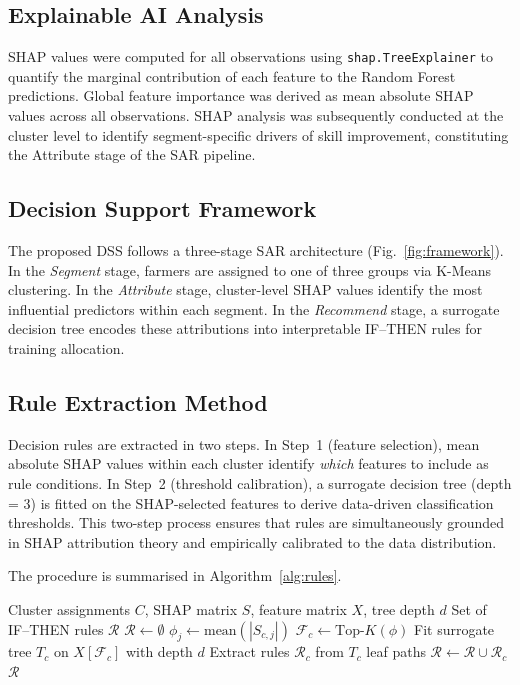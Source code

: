 \documentclass[3p,twocolumn,authoryear]{elsarticle}
\begin{document}
\subsection{Explainable AI Analysis}

SHAP values were computed for all observations using
\texttt{shap.TreeExplainer} \citep{lundberg2017} to quantify
the marginal contribution of each feature to the Random Forest
predictions.
Global feature importance was derived as mean absolute SHAP values
across all observations.
SHAP analysis was subsequently conducted at the cluster level to
identify segment-specific drivers of skill improvement,
constituting the Attribute stage of the SAR pipeline.

\subsection{Decision Support Framework}

The proposed DSS follows a three-stage SAR architecture
(Fig.~\ref{fig:framework}).
In the \textit{Segment} stage, farmers are assigned to one of
three groups via K-Means clustering.
In the \textit{Attribute} stage, cluster-level SHAP values
identify the most influential predictors within each segment.
In the \textit{Recommend} stage, a surrogate decision tree
encodes these attributions into interpretable IF--THEN rules
for training allocation.

\subsection{Rule Extraction Method}

Decision rules are extracted in two steps.
In Step~1 (feature selection), mean absolute SHAP values within
each cluster identify \textit{which} features to include as
rule conditions.
In Step~2 (threshold calibration), a surrogate decision tree
(depth = 3) is fitted on the SHAP-selected features to derive
data-driven classification thresholds.
This two-step process ensures that rules are simultaneously
grounded in SHAP attribution theory and empirically
calibrated to the data distribution.

The procedure is summarised in Algorithm~\ref{alg:rules}.

\begin{algorithm}
\caption{SHAP-guided Surrogate Rule Extraction}
\label{alg:rules}
\begin{algorithmic}[1]
\Require Cluster assignments $C$, SHAP matrix $S$,
         feature matrix $X$, tree depth $d$
\Ensure Set of IF--THEN rules $\mathcal{R}$
\State $\mathcal{R} \gets \emptyset$
    \State $\phi_j \gets \text{mean}(|S_{c,j}|)$
    \State $\mathcal{F}_c \gets \text{Top-}K(\phi)$
    \State Fit surrogate tree $T_c$ on $X[\mathcal{F}_c]$
           with depth $d$
    \State Extract rules $\mathcal{R}_c$ from $T_c$ leaf paths
    \State $\mathcal{R} \gets \mathcal{R} \cup \mathcal{R}_c$
\EndFor
\State \Return $\mathcal{R}$
\end{algorithmic}
\end{algorithm}
\end{document}
